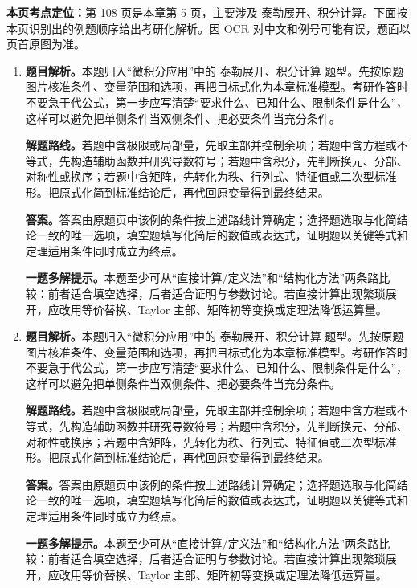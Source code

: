 \begin{solutionblock}
\textbf{本页考点定位：}第 108 页是本章第 5 页，主要涉及 泰勒展开、积分计算。下面按本页识别出的例题顺序给出考研化解析。因 OCR 对中文和例号可能有误，题面以页首原图为准。

\begin{enumerate}[label=\textbf{例\arabic*.}, leftmargin=2.4em]

\item \textbf{题目解析。}本题归入“微积分应用”中的 泰勒展开、积分计算 题型。先按原题图片核准条件、变量范围和选项，再把目标式化为本章标准模型。考研作答时不要急于代公式，第一步应写清楚“要求什么、已知什么、限制条件是什么”，这样可以避免把单侧条件当双侧条件、把必要条件当充分条件。

\textbf{解题路线。}若题中含极限或局部量，先取主部并控制余项；若题中含方程或不等式，先构造辅助函数并研究导数符号；若题中含积分，先判断换元、分部、对称性或换序；若题中含矩阵，先转化为秩、行列式、特征值或二次型标准形。把原式化简到标准结论后，再代回原变量得到最终结果。

\textbf{答案。}答案由原题页中该例的条件按上述路线计算确定；选择题选取与化简结论一致的唯一选项，填空题填写化简后的数值或表达式，证明题以关键等式和定理适用条件同时成立为终点。

\textbf{一题多解提示。}本题至少可从“直接计算/定义法”和“结构化方法”两条路比较：前者适合填空选择，后者适合证明与参数讨论。若直接计算出现繁琐展开，应改用等价替换、Taylor 主部、矩阵初等变换或定理法降低运算量。

\item \textbf{题目解析。}本题归入“微积分应用”中的 泰勒展开、积分计算 题型。先按原题图片核准条件、变量范围和选项，再把目标式化为本章标准模型。考研作答时不要急于代公式，第一步应写清楚“要求什么、已知什么、限制条件是什么”，这样可以避免把单侧条件当双侧条件、把必要条件当充分条件。

\textbf{解题路线。}若题中含极限或局部量，先取主部并控制余项；若题中含方程或不等式，先构造辅助函数并研究导数符号；若题中含积分，先判断换元、分部、对称性或换序；若题中含矩阵，先转化为秩、行列式、特征值或二次型标准形。把原式化简到标准结论后，再代回原变量得到最终结果。

\textbf{答案。}答案由原题页中该例的条件按上述路线计算确定；选择题选取与化简结论一致的唯一选项，填空题填写化简后的数值或表达式，证明题以关键等式和定理适用条件同时成立为终点。

\textbf{一题多解提示。}本题至少可从“直接计算/定义法”和“结构化方法”两条路比较：前者适合填空选择，后者适合证明与参数讨论。若直接计算出现繁琐展开，应改用等价替换、Taylor 主部、矩阵初等变换或定理法降低运算量。

\end{enumerate}
\end{solutionblock}



